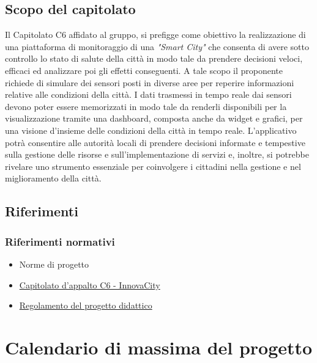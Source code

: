 \documentclass{article}
\begin{document}
\subsection{Scopo del capitolato}
Il Capitolato C6 affidato al gruppo, si prefigge come obiettivo la realizzazione di una piattaforma di monitoraggio di una \textit{"Smart City"} che consenta di avere sotto controllo lo stato di salute della città in modo tale da prendere decisioni veloci, efficaci ed analizzare poi gli effetti conseguenti.
A tale scopo il proponente richiede di simulare dei sensori posti in diverse aree per reperire informazioni relative alle condizioni della città. 
I dati trasmessi in tempo reale dai sensori devono poter essere memorizzati in modo tale da renderli disponibili per la visualizzazione tramite una dashboard, composta anche da widget e grafici, per una visione d'insieme delle condizioni della città in tempo reale. 
L'applicativo potrà consentire alle autorità locali di prendere decisioni informate e tempestive sulla gestione delle risorse e sull'implementazione di servizi e, inoltre, si potrebbe rivelare uno strumento essenziale per coinvolgere i cittadini nella gestione e nel miglioramento della città.

\subsection{Riferimenti}
\subsubsection{Riferimenti normativi}
\begin{itemize}
\item Norme di progetto
\item \href {https://www.math.unipd.it/~tullio/IS-1/2023/Progetto/C6.pdf} {Capitolato d'appalto C6 - InnovaCity}
\item \href {https://www.math.unipd.it/~tullio/IS-1/2023/Dispense/PD2.pdf} {Regolamento del progetto didattico}
\end{itemize}

\section{Calendario di massima del progetto}
\end{document}
